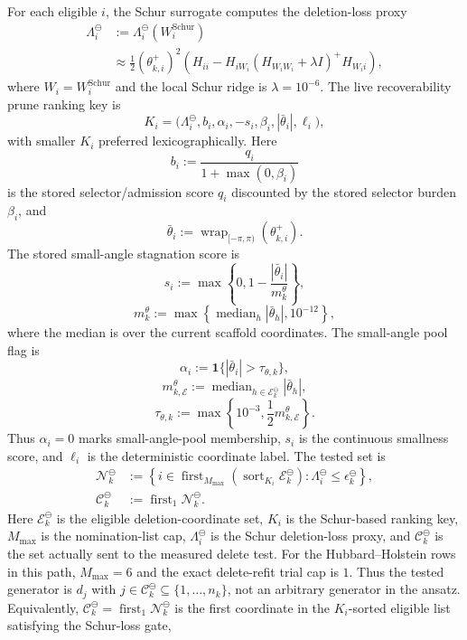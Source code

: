 \documentclass[
  reprint,
  amsmath,
  amssymb,
  aps,
  pra,
  nofootinbib,
  superscriptaddress,
  floatfix
]{revtex4-2}
\begin{document}
For each eligible \(i\), the Schur surrogate computes the deletion-loss proxy
\[
\begin{aligned}
\Lambda_i^{\ominus}
&:=
\Lambda_i^{\ominus}(W_i^{\mathrm{Schur}})
\\
&\approx
\frac12(\theta_{k,i}^+)^2
\left(
H_{ii}
-
H_{iW_i}
(H_{W_iW_i}+\lambda I)^+
H_{W_i i}
\right),
\end{aligned}
\]
where \(W_i=W_i^{\mathrm{Schur}}\) and the local Schur ridge is \(\lambda=10^{-6}\).  The live recoverability prune ranking key is
\[
K_i=
\bigl(
\Lambda_i^{\ominus},
b_i,
\alpha_i,
-s_i,
\beta_i,
|\bar\theta_i|,
\ell_i
\bigr),
\]
with smaller \(K_i\) preferred lexicographically.  Here
\[
b_i:=\frac{q_i}{1+\max(0,\beta_i)}
\]
is the stored selector/admission score \(q_i\) discounted by the stored selector burden \(\beta_i\), and
\[
\bar\theta_i
:=
\operatorname{wrap}_{[-\pi,\pi)}(\theta_{k,i}^+).
\]
The stored small-angle stagnation score is
\[
s_i
:=
\max\left\{0,1-\frac{|\bar\theta_i|}{m_k^\theta}\right\},
\]
\[
m_k^\theta
:=
\max\left\{
\operatorname{median}_{h}|\bar\theta_h|,
10^{-12}
\right\},
\]
where the median is over the current scaffold coordinates.
The small-angle pool flag is
\[
\alpha_i
:=
\mathbf 1\{|\bar\theta_i|>\tau_{\theta,k}\},
\]
\[
m_{k,\mathcal E}^{\theta}
:=
\operatorname{median}_{h\in\mathcal E_k^{\ominus}}
|\bar\theta_h|,
\]
\[
\tau_{\theta,k}
:=
\max\left\{
10^{-3},
\frac12 m_{k,\mathcal E}^{\theta}
\right\}.
\]
Thus \(\alpha_i=0\) marks small-angle-pool membership, \(s_i\) is the continuous smallness score, and \(\ell_i\) is the deterministic coordinate label.  The tested set is
\[
\begin{aligned}
\mathcal N_k^{\ominus}
&:=
\left\{
i\in
\operatorname{first}_{M_{\max}}
\left(
\operatorname{sort}_{K_i}
\mathcal E_k^{\ominus}
\right)
:
\Lambda_i^{\ominus}\le \epsilon_k^{\ominus}
\right\},
\\
\mathcal C_k^{\ominus}
&:=
\operatorname{first}_{1}
\mathcal N_k^{\ominus}.
\end{aligned}
\]
Here \(\mathcal E_k^{\ominus}\) is the eligible deletion-coordinate set, \(K_i\) is the Schur-based ranking key, \(M_{\max}\) is the nomination-list cap, \(\Lambda_i^{\ominus}\) is the Schur deletion-loss proxy, and \(\mathcal C_k^{\ominus}\) is the set actually sent to the measured delete test.  For the Hubbard--Holstein rows in this path, \(M_{\max}=6\) and the exact delete-refit trial cap is \(1\).  Thus the tested generator is \(d_j\) with \(j\in\mathcal C_k^{\ominus}\subseteq\{1,\ldots,n_k\}\), not an arbitrary generator in the ansatz.  Equivalently, \(\mathcal C_k^{\ominus}=\operatorname{first}_{1}\mathcal N_k^{\ominus}\) is the first coordinate in the \(K_i\)-sorted eligible list satisfying the Schur-loss gate,
\end{document}
